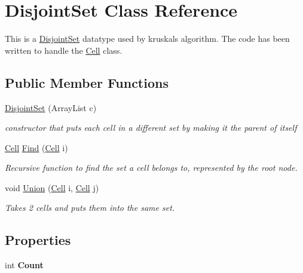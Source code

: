 \hypertarget{class_disjoint_set}{}\section{Disjoint\+Set Class Reference}
\label{class_disjoint_set}


This is a \mbox{\hyperlink{class_disjoint_set}{Disjoint\+Set}} datatype used by kruskal\textquotesingle{}s algorithm. The code has been written to handle the \mbox{\hyperlink{class_cell}{Cell}} class.  


\subsection*{Public Member Functions}
\begin{DoxyCompactItemize}
\item 
\mbox{\hyperlink{class_disjoint_set_a2e6873a82e88a6b02268b6be45a774b2}{Disjoint\+Set}} (Array\+List c)
\begin{DoxyCompactList}\small\item\em constructor that puts each cell in a different set by making it the parent of itself \end{DoxyCompactList}\item 
\mbox{\hyperlink{class_cell}{Cell}} \mbox{\hyperlink{class_disjoint_set_a79914532cc72592a64d8e2e9fd91a5a0}{Find}} (\mbox{\hyperlink{class_cell}{Cell}} i)
\begin{DoxyCompactList}\small\item\em Recursive function to find the set a cell belongs to, represented by the root node. \end{DoxyCompactList}\item 
void \mbox{\hyperlink{class_disjoint_set_a5c28601d0773150fd191ed4d2f5f6f0a}{Union}} (\mbox{\hyperlink{class_cell}{Cell}} i, \mbox{\hyperlink{class_cell}{Cell}} j)
\begin{DoxyCompactList}\small\item\em Takes 2 cells and puts them into the same set. \end{DoxyCompactList}\end{DoxyCompactItemize}
\subsection*{Properties}
\begin{DoxyCompactItemize}
\item 
\mbox{\label{class_disjoint_set_a7500582dba7a04d391f0d4d2e1705e36}} 
int {\bfseries Count}
\end{DoxyCompactItemize}
